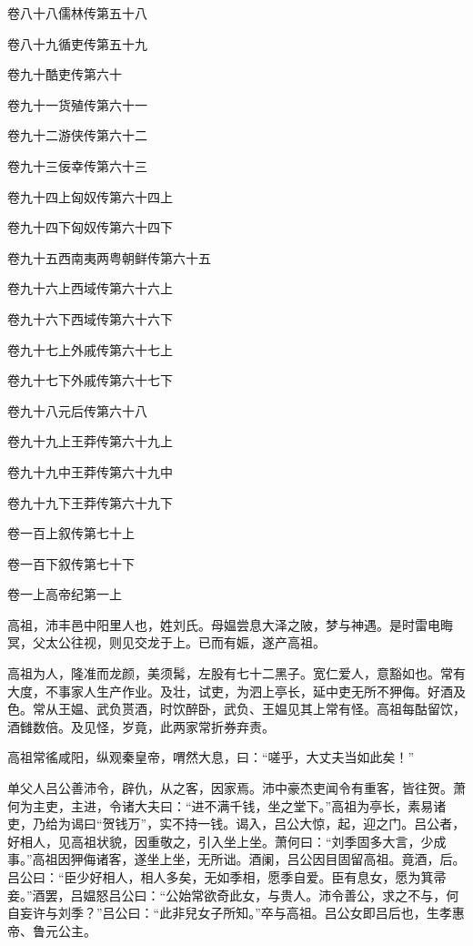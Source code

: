 \documentclass[12pt,UTF8]{ctexbook}
\begin{document}
卷八十八儒林传第五十八

卷八十九循吏传第五十九

卷九十酷吏传第六十

卷九十一货殖传第六十一

卷九十二游侠传第六十二

卷九十三佞幸传第六十三

卷九十四上匈奴传第六十四上

卷九十四下匈奴传第六十四下

卷九十五西南夷两粤朝鲜传第六十五

卷九十六上西域传第六十六上

卷九十六下西域传第六十六下

卷九十七上外戚传第六十七上

卷九十七下外戚传第六十七下

卷九十八元后传第六十八

卷九十九上王莽传第六十九上

卷九十九中王莽传第六十九中

卷九十九下王莽传第六十九下

卷一百上叙传第七十上

卷一百下叙传第七十下




卷一上高帝纪第一上



高祖，沛丰邑中阳里人也，姓刘氏。母媪尝息大泽之陂，梦与神遇。是时雷电晦冥，父太公往视，则见交龙于上。已而有娠，遂产高祖。



高祖为人，隆准而龙颜，美须髯，左股有七十二黑子。宽仁爱人，意豁如也。常有大度，不事家人生产作业。及壮，试吏，为泗上亭长，延中吏无所不狎侮。好酒及色。常从王媪、武负贳酒，时饮醉卧，武负、王媪见其上常有怪。高祖每酤留饮，酒雠数倍。及见怪，岁竟，此两家常折券弃责。



高祖常徭咸阳，纵观秦皇帝，喟然大息，曰：“嗟乎，大丈夫当如此矣！”



单父人吕公善沛令，辟仇，从之客，因家焉。沛中豪杰吏闻令有重客，皆往贺。萧何为主吏，主进，令诸大夫曰：“进不满千钱，坐之堂下。”高祖为亭长，素易诸吏，乃给为谒曰“贺钱万”，实不持一钱。谒入，吕公大惊，起，迎之门。吕公者，好相人，见高祖状貌，因重敬之，引入坐上坐。萧何曰：“刘季固多大言，少成事。”高祖因狎侮诸客，遂坐上坐，无所诎。酒阑，吕公因目固留高祖。竟酒，后。吕公曰：“臣少好相人，相人多矣，无如季相，愿季自爱。臣有息女，愿为箕帚妾。”酒罢，吕媪怒吕公曰：“公始常欲奇此女，与贵人。沛令善公，求之不与，何自妄许与刘季？”吕公曰：“此非兒女子所知。”卒与高祖。吕公女即吕后也，生孝惠帝、鲁元公主。
\end{document}

